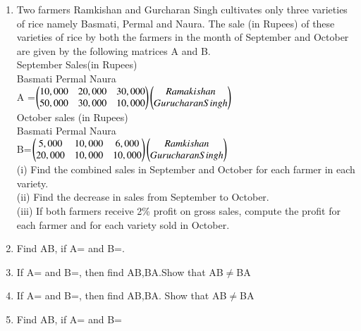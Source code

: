 \begin{enumerate}[label=\arabic*.,ref=\thesubsection.\theenumi]
    

    \item Two farmers Ramkishan and Gurcharan Singh cultivates only three
varieties of rice namely Basmati, Permal and Naura. The sale (in Rupees) of these
varieties of rice by both the farmers in the month of September and October are given
by the following matrices A and B. \\
September Sales(in Rupees)\\
   Basmati Permal Naura\\
A =$\begin{pmatrix}10,000 &20,000 &30,000\\50,000 &30,000 &10,000\end{pmatrix}$$\begin{pmatrix}Ramakishan\\Gurucharan Singh\end{pmatrix}$\\

October sales (in Rupees)\\
  Basmati Permal Naura\\
B=$\begin{pmatrix}5,000 &10,000 &6,000\\20,000 &10,000 &10,000\end{pmatrix}$$\begin{pmatrix}Ramkishan\\Gurucharan Singh\end{pmatrix}$\\
(i) Find the combined sales in September and October for each farmer in each
variety.\\
(ii) Find the decrease in sales from September to October.\\
(iii) If both farmers receive 2\% profit on gross sales, compute the profit for each
farmer and for each variety sold in October. \\																																															
   
    \item  Find AB, if A= and B=.\\
    \item  If A= and B=, then find AB,BA.Show that AB$\neq$BA

   
     \item If A= and  B=, then find AB,BA. Show that AB$\neq$BA\\
     
   
    \item Find AB, if A= and B=\\
     

\end{enumerate}
